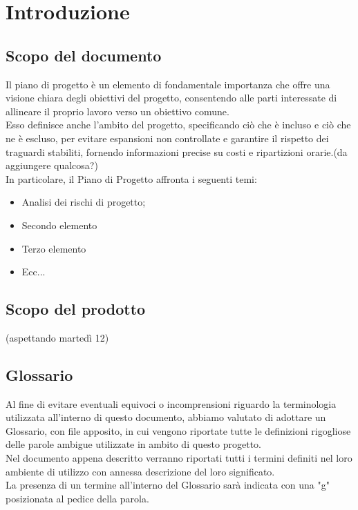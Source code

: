 

\section{Introduzione}
\subsection{Scopo del documento}
Il piano di progetto è un elemento di fondamentale importanza che offre una visione chiara degli obiettivi del progetto, 
consentendo alle parti interessate di allineare il proprio lavoro verso un obiettivo comune.\\
Esso definisce anche l'ambito del progetto, specificando ciò che è incluso e ciò che ne è escluso, per evitare espansioni 
non controllate e garantire il rispetto dei traguardi stabiliti, fornendo informazioni precise su costi e ripartizioni orarie.(da aggiungere qualcosa?)\\
In particolare, il Piano di Progetto affronta i seguenti temi:
\begin{itemize}
    \item Analisi dei rischi di progetto;
    \item Secondo elemento
    \item Terzo elemento
    \item Ecc...
\end{itemize}

\subsection{Scopo del prodotto}
(aspettando martedì 12)

\subsection{Glossario}
Al fine di evitare eventuali equivoci o incomprensioni riguardo la terminologia utilizzata all’interno di questo documento, 
abbiamo valutato di adottare un Glossario, con file apposito, in cui
vengono riportate tutte le definizioni rigogliose delle parole ambigue utilizzate in ambito di
questo progetto.\\
Nel documento appena descritto verranno riportati tutti i termini definiti nel
loro ambiente di utilizzo con annessa descrizione del loro significato.\\
La presenza di un termine all'interno del Glossario sarà indicata con una "g" posizionata al pedice della parola.

